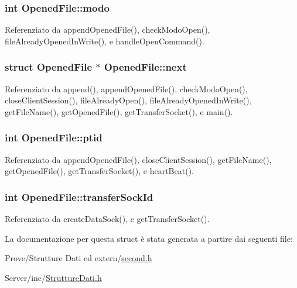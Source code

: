 \subsubsection[{modo}]{\setlength{\rightskip}{0pt plus 5cm}int Opened\+File\+::modo}\label{structOpenedFile_a6d9f22ff6ba81506ba9c4a60f27c4f32}


Referenziato da append\+Opened\+File(), check\+Modo\+Open(), file\+Already\+Opened\+In\+Write(), e handle\+Open\+Command().

\hypertarget{structOpenedFile_a9b8c8b995cdda6da249a6ce9a9df98b2}{}
\subsubsection[{next}]{\setlength{\rightskip}{0pt plus 5cm}struct {\bf Opened\+File} $\ast$ Opened\+File\+::next}\label{structOpenedFile_a9b8c8b995cdda6da249a6ce9a9df98b2}


Referenziato da append(), append\+Opened\+File(), check\+Modo\+Open(), close\+Client\+Session(), file\+Already\+Open(), file\+Already\+Opened\+In\+Write(), get\+File\+Name(), get\+Opened\+File(), get\+Transfer\+Socket(), e main().

\hypertarget{structOpenedFile_aba1e9ae457adfa6a9cc6a22ca4ee290d}{}
\subsubsection[{ptid}]{\setlength{\rightskip}{0pt plus 5cm}int Opened\+File\+::ptid}\label{structOpenedFile_aba1e9ae457adfa6a9cc6a22ca4ee290d}


Referenziato da append\+Opened\+File(), close\+Client\+Session(), get\+File\+Name(), get\+Opened\+File(), get\+Transfer\+Socket(), e heart\+Beat().

\hypertarget{structOpenedFile_a122a7d3d722dc1f7c63857af2024f098}{}
\subsubsection[{transfer\+Sock\+Id}]{\setlength{\rightskip}{0pt plus 5cm}int Opened\+File\+::transfer\+Sock\+Id}\label{structOpenedFile_a122a7d3d722dc1f7c63857af2024f098}


Referenziato da create\+Data\+Sock(), e get\+Transfer\+Socket().



La documentazione per questa struct è stata generata a partire dai seguenti file\+:\begin{DoxyCompactItemize}
\item 
Prove/\+Strutture Dati ed extern/\hyperlink{second_8h}{second.\+h}\item 
Server/inc/\hyperlink{StruttureDati_8h}{Strutture\+Dati.\+h}\end{DoxyCompactItemize}
